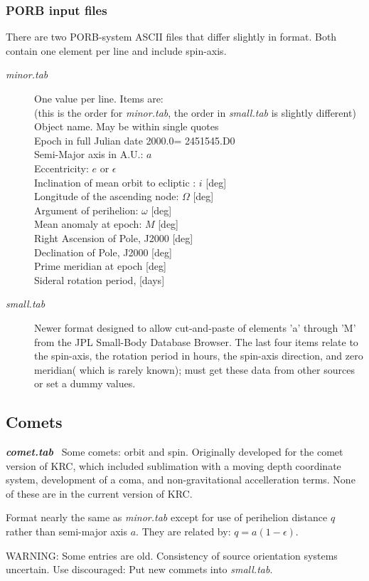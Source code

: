 \documentclass[draft]{article}
\newcommand{\qi}{\\ \hspace*{2.em}}      %
\newcommand{\qii}{\\ \hspace*{4.em}}     %
\newcommand{\nf}{\textit}  %
\begin{document}
\subsubsection{PORB input files} %
There are two PORB-system ASCII files that differ slightly in format. Both
contain one element per line and include spin-axis.

\begin{description} 
 \item [\textit{minor.tab}] One value per line. Items are: 
\qii (this is the order for \nf{minor.tab}, the order in \nf{small.tab} is slightly different)
 \qi Object name. May be within single quotes
 \qi Epoch in full Julian date     2000.0= 2451545.D0 
 \qi Semi-Major axis in A.U.: $a$
 \qi Eccentricity: $e$ or $\epsilon$
 \qi Inclination of mean orbit to ecliptic : $i$ [deg]
 \qi Longitude of the ascending node: $\Omega $ [deg]
 \qi Argument of perihelion: $\omega$ [deg]
 \qi Mean anomaly at epoch: $M$ [deg]
 \qi Right Ascension of Pole, J2000 [deg]
 \qi Declination of Pole, J2000 [deg]
 \qi Prime meridian at epoch [deg]
 \qi Sideral rotation period, [days]

 \item [\textit{small.tab}] Newer format designed to allow cut-and-paste of
   elements 'a' through 'M' from the JPL Small-Body Database Browser.  The last
   four items relate to the spin-axis, the rotation period in hours, the
   spin-axis direction, and zero meridian( which is rarely known); must get
   these data from other sources or set a dummy values.
 \end{description}

\subsection{Comets}

\textbf{\textit{comet.tab}} \  Some comets: orbit and spin. 
Originally developed for the comet version of KRC, which included sublimation with a moving depth coordinate system, development of a coma, and non-gravitational accelleration terms. None of these are in the current version of KRC.

Format nearly the same as \nf{minor.tab} except for use of perihelion distance $q$ rather than semi-major axis $a$. They are related by: $q=a(1- \epsilon)$.

WARNING: Some entries are old. Consistency of source orientation systems uncertain. Use discouraged: Put new commets into \nf{small.tab}. 
\end{document}
